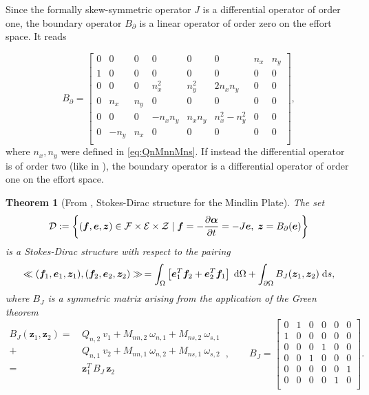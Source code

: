 \documentclass[preprint,12pt]{elsarticle}
\newtheorem{theorem}{Theorem}
\begin{document}
Since the formally skew-symmetric operator $J$ is a differential operator of order one, the boundary operator $B_{\partial}$ is a linear operator of order zero on the effort space. It reads

\begin{equation}
B_{\partial} = 
\begin{bmatrix}
0 & 0 & 0 & 0 & 0 & 0 & n_x & n_y \\
1 & 0 & 0 & 0 & 0 & 0 & 0 & 0\\
0 & 0 & 0 & n_x^2 & n_y^2 & 2 n_x n_y & 0 & 0 \\
0 & n_x & n_y & 0 & 0 & 0 & 0 & 0 \\ 
0 & 0 & 0 & -n_x n_y & n_x n_y & n_x^2 - n_y^2 & 0 & 0 \\
0 & -n_y & n_x & 0 & 0 & 0 & 0 & 0 \\ 
\end{bmatrix},
\end{equation}
where $n_x, n_y$ were defined in \eqref{eq:QnMnnMns}. If instead the differential operator is  of order two (like in \cite{BrugnoliKir}), the boundary operator is  a differential operator of order one on the effort space.


\begin{theorem}[From \cite{MacchelliMindlin}, Stokes-Dirac structure for the Mindlin Plate]
	The set
	\begin{equation}
	\mathcal{D} := \left\{ (\bm{f},\bm{e},\bm{z}) \in \mathcal{F}\times\mathcal{E}\times\mathcal{Z} \; | \; \bm{f}= - \diffp{\bm{\alpha}}{t} = -J \bm{e}, \; \bm{z} = B_{\partial}(\bm{e}) \right\}
	\end{equation} 
	is a Stokes-Dirac structure with respect to the pairing
	\begin{equation}
	\ll (\bm{f}_1, \bm{e}_1, \bm{z}_1), (\bm{f}_2, \bm{e}_2, \bm{z}_2) \gg  \,= \int_{\Omega} \left[ \bm{e}_1^T \bm{f}_2 + \bm{e}_2^T \bm{f}_1 \right] \d\Omega  + \int_{\partial \Omega} B_J(\bm{z}_1, \bm{z}_2) \d{s},
	\end{equation}
	where $B_J$ is a symmetric matrix  arising from the application of the Green theorem
	\begin{equation}
	\begin{aligned}
	B_J(\bm{z}_1,\bm{z}_2) 
	= \, &Q_{n,2} \ v_1 + M_{nn, 2} \ \omega_{n, 1} + M_{ns, 2} \ \omega_{s, 1} \\
	+ \, &Q_{n,1} \ v_2 + M_{nn, 1} \ \omega_{n, 2} + M_{ns, 1} \ \omega_{s, 2} \\
	= &\bm{z}_1^T \, B_J \, \bm{z}_2 \\
	\end{aligned} \, ,  \qquad
  	B_J = 
	\begin{bmatrix}
	0 & 1 & 0 & 0 & 0 & 0 \\
	1 & 0 & 0 & 0 & 0 & 0 \\
	0 & 0 & 0 & 1 & 0 & 0 \\
	0 & 0 & 1 & 0 & 0 & 0 \\ 
	0 & 0 & 0 & 0 & 0 & 1 \\
	0 & 0 & 0 & 0 & 1 & 0 \\ 
	\end{bmatrix}.
	\end{equation}
\end{theorem}
\end{document}
